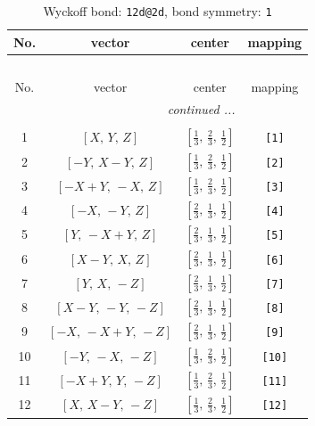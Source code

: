 \documentclass[fleqn,8pt]{jsarticle}
\begin{document}
\begin{longtable}{cccc}
\caption{Wyckoff bond: {\tt 12d@2d}, bond symmetry: {\tt 1}}
 \\
 \hline \hline
No. & vector & center & mapping \\ \hline \endfirsthead

\multicolumn{3}{l}{\tablename\ \thetable{}} \\
 \hline \hline
No. & vector & center & mapping \\ \hline \endhead

 \hline \hline
\multicolumn{3}{r}{\footnotesize\it continued ...} \\ \endfoot

 \hline \hline
\multicolumn{3}{r}{} \\ \endlastfoot

1 & $\left[ X,\, Y,\, Z \right]$ & $\left[ \frac{1}{3},\, \frac{2}{3},\, \frac{1}{2} \right]$ & {\tt [1]} \\ \hline
2 & $\left[ - Y,\, X - Y,\, Z \right]$ & $\left[ \frac{1}{3},\, \frac{2}{3},\, \frac{1}{2} \right]$ & {\tt [2]} \\ \hline
3 & $\left[ - X + Y,\, - X,\, Z \right]$ & $\left[ \frac{1}{3},\, \frac{2}{3},\, \frac{1}{2} \right]$ & {\tt [3]} \\ \hline
4 & $\left[ - X,\, - Y,\, Z \right]$ & $\left[ \frac{2}{3},\, \frac{1}{3},\, \frac{1}{2} \right]$ & {\tt [4]} \\ \hline
5 & $\left[ Y,\, - X + Y,\, Z \right]$ & $\left[ \frac{2}{3},\, \frac{1}{3},\, \frac{1}{2} \right]$ & {\tt [5]} \\ \hline
6 & $\left[ X - Y,\, X,\, Z \right]$ & $\left[ \frac{2}{3},\, \frac{1}{3},\, \frac{1}{2} \right]$ & {\tt [6]} \\ \hline
7 & $\left[ Y,\, X,\, - Z \right]$ & $\left[ \frac{2}{3},\, \frac{1}{3},\, \frac{1}{2} \right]$ & {\tt [7]} \\ \hline
8 & $\left[ X - Y,\, - Y,\, - Z \right]$ & $\left[ \frac{2}{3},\, \frac{1}{3},\, \frac{1}{2} \right]$ & {\tt [8]} \\ \hline
9 & $\left[ - X,\, - X + Y,\, - Z \right]$ & $\left[ \frac{2}{3},\, \frac{1}{3},\, \frac{1}{2} \right]$ & {\tt [9]} \\ \hline
10 & $\left[ - Y,\, - X,\, - Z \right]$ & $\left[ \frac{1}{3},\, \frac{2}{3},\, \frac{1}{2} \right]$ & {\tt [10]} \\ \hline
11 & $\left[ - X + Y,\, Y,\, - Z \right]$ & $\left[ \frac{1}{3},\, \frac{2}{3},\, \frac{1}{2} \right]$ & {\tt [11]} \\ \hline
12 & $\left[ X,\, X - Y,\, - Z \right]$ & $\left[ \frac{1}{3},\, \frac{2}{3},\, \frac{1}{2} \right]$ & {\tt [12]} \\
\end{longtable}
\end{document}
